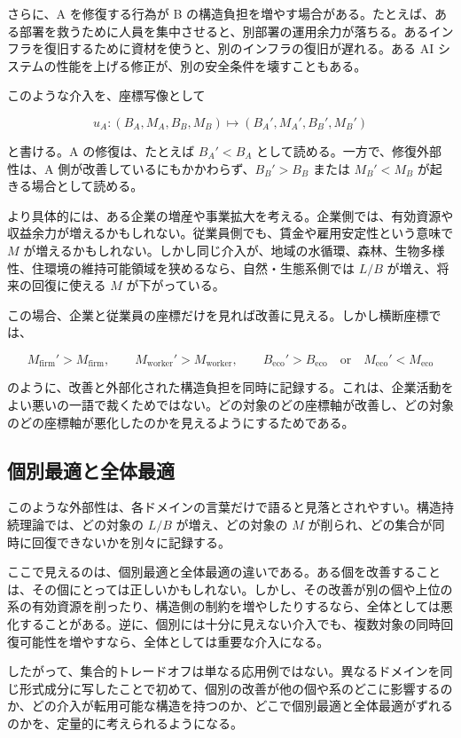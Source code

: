 \documentclass[12pt,a4paper]{article}
\begin{document}
さらに、A を修復する行為が B の構造負担を増やす場合がある。たとえば、ある部署を救うために人員を集中させると、別部署の運用余力が落ちる。あるインフラを復旧するために資材を使うと、別のインフラの復旧が遅れる。ある AI システムの性能を上げる修正が、別の安全条件を壊すこともある。

このような介入を、座標写像として

\[
u_A:(B_A,M_A,B_B,M_B)\mapsto(B_A',M_A',B_B',M_B')
\]

と書ける。A の修復は、たとえば \(B_A'<B_A\) として読める。一方で、修復外部性は、A 側が改善しているにもかかわらず、\(B_B'>B_B\) または \(M_B'<M_B\) が起きる場合として読める。

より具体的には、ある企業の増産や事業拡大を考える。企業側では、有効資源や収益余力が増えるかもしれない。従業員側でも、賃金や雇用安定性という意味で \(M\) が増えるかもしれない。しかし同じ介入が、地域の水循環、森林、生物多様性、住環境の維持可能領域を狭めるなら、自然・生態系側では \(L/B\) が増え、将来の回復に使える \(M\) が下がっている。

この場合、企業と従業員の座標だけを見れば改善に見える。しかし横断座標では、

\[
M_{\mathrm{firm}}'>M_{\mathrm{firm}},
\qquad
M_{\mathrm{worker}}'>M_{\mathrm{worker}},
\qquad
B_{\mathrm{eco}}'>B_{\mathrm{eco}}
\quad\text{or}\quad
M_{\mathrm{eco}}'<M_{\mathrm{eco}}
\]

のように、改善と外部化された構造負担を同時に記録する。これは、企業活動をよい悪いの一語で裁くためではない。どの対象のどの座標軸が改善し、どの対象のどの座標軸が悪化したのかを見えるようにするためである。

\subsection{個別最適と全体最適}\label{ux500bux5225ux6700ux9069ux3068ux5168ux4f53ux6700ux9069}

このような外部性は、各ドメインの言葉だけで語ると見落とされやすい。構造持続理論では、どの対象の \(L/B\) が増え、どの対象の \(M\) が削られ、どの集合が同時に回復できないかを別々に記録する。

ここで見えるのは、個別最適と全体最適の違いである。ある個を改善することは、その個にとっては正しいかもしれない。しかし、その改善が別の個や上位の系の有効資源を削ったり、構造側の制約を増やしたりするなら、全体としては悪化することがある。逆に、個別には十分に見えない介入でも、複数対象の同時回復可能性を増やすなら、全体としては重要な介入になる。

したがって、集合的トレードオフは単なる応用例ではない。異なるドメインを同じ形式成分に写したことで初めて、個別の改善が他の個や系のどこに影響するのか、どの介入が転用可能な構造を持つのか、どこで個別最適と全体最適がずれるのかを、定量的に考えられるようになる。
\end{document}
